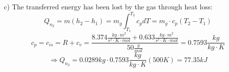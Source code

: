 c) The transferred energy has been lost by the gas through heat loss:
\[ Q_{n_2} = m(h_2 - h_1) = m_g \int_{T_1}^{T_2} c_p dT = m_g \cdot c_p (T_2 - T_1) \]
\[ c_p = c_{is} = R + c_v = \frac{8.374 \frac{kg \cdot m^2}{s^2 \cdot K \cdot mol} + 0.633 \frac{kg \cdot m^2}{s^2 \cdot K \cdot mol}}{50 \frac{g}{mol}} = 0.7593 \frac{kg}{kg \cdot K} \]
\[ \Rightarrow Q_{n_2} = 0.0289 kg \cdot 0.7593 \frac{kg}{kg \cdot K} (500 K) = 77.35 kJ \]